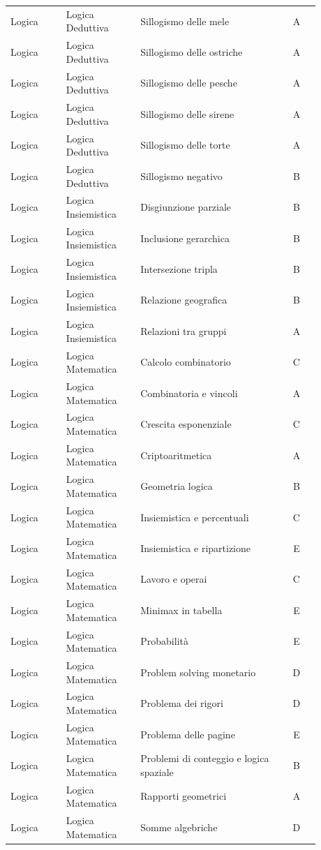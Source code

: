 \documentclass[20pt, a4paper]{article}
\begin{document}
\begin{longtable}{@{}>{\raggedright\arraybackslash}p{0.18\linewidth}>{\raggedright\arraybackslash}p{0.24\linewidth}>{\raggedright\arraybackslash}p{0.46\linewidth}c@{}}
Logica & Logica Deduttiva & Sillogismo delle mele & A \\
Logica & Logica Deduttiva & Sillogismo delle ostriche & A \\
Logica & Logica Deduttiva & Sillogismo delle pesche & A \\
Logica & Logica Deduttiva & Sillogismo delle sirene & A \\
Logica & Logica Deduttiva & Sillogismo delle torte & A \\
Logica & Logica Deduttiva & Sillogismo negativo & B \\
Logica & Logica Insiemistica & Disgiunzione parziale & B \\
Logica & Logica Insiemistica & Inclusione gerarchica & B \\
Logica & Logica Insiemistica & Intersezione tripla & B \\
Logica & Logica Insiemistica & Relazione geografica & B \\
Logica & Logica Insiemistica & Relazioni tra gruppi & A \\
Logica & Logica Matematica & Calcolo combinatorio & C \\
Logica & Logica Matematica & Combinatoria e vincoli & A \\
Logica & Logica Matematica & Crescita esponenziale & C \\
Logica & Logica Matematica & Criptoaritmetica & A \\
Logica & Logica Matematica & Geometria logica & B \\
Logica & Logica Matematica & Insiemistica e percentuali & C \\
Logica & Logica Matematica & Insiemistica e ripartizione & E \\
Logica & Logica Matematica & Lavoro e operai & C \\
Logica & Logica Matematica & Minimax in tabella & E \\
Logica & Logica Matematica & Probabilità & E \\
Logica & Logica Matematica & Problem solving monetario & D \\
Logica & Logica Matematica & Problema dei rigori & D \\
Logica & Logica Matematica & Problema delle pagine & E \\
Logica & Logica Matematica & Problemi di conteggio e logica spaziale & B \\
Logica & Logica Matematica & Rapporti geometrici & A \\
Logica & Logica Matematica & Somme algebriche & D \\

\end{longtable}
\end{document}
